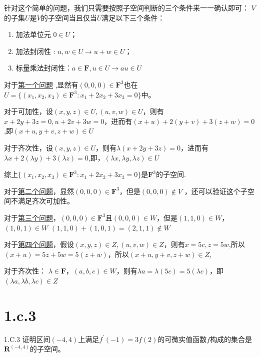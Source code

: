 \documentclass[10pt,a4paper,UTF8]{article}
\begin{document}
\begin{answer}
针对这个简单的问题，我们只需要按照子空间判断的三个条件来一一确认即可：
\(V\)的子集\(U\)是\(V\)的子空间当且仅当\(U\)满足以下三个条件：

\begin{enumerate}
\item 加法单位元 \(0\in U\)；
\item 加法封闭性 : \(u,w\in U \rightarrow u+w\in U\)；
\item 标量乘法封闭性：\(a\in \mathbf{F}, u\in U \rightarrow au\in U\)
\end{enumerate}

对于\hyperref[orgcfdd0be]{第一个问题} ,显然有\((0,0,0)\in \mathbf{F}^{3}\)也在\(U=\{(x_{1},x_{2},x_{3})\in \mathbf{F}^{3}: x_{1} + 2x_{2} + 3x_{3} = 0\}\)中。

对于可加性，设\((x,y,z)\in U,(u,v,w)\in U\)，则有\(x+2y +3z = 0, u+2v+3w =0\)，进而有\((x+u) + 2(y+v) + 3(z+w) = 0\),即\((x+u,y+v,z+w)\in U\)

对于齐次性，设\((x,y,z)\in U\)，则有\(\lambda(x+2y+3z) = 0\)，进而有\(\lambda x + 2(\lambda y) + 3(\lambda z) = 0\),即，\((\lambda x,\lambda y,\lambda z)\in U\)

综上\(\{(x_{1},x_{2},x_{3})\in \mathbf{F}^{3}: x_{1} + 2x_{2} + 3x_{3} = 0\}\)是\(\mathbf{F}^{3}\)的子空间.

对于\hyperref[orga1a8fae]{第二个问题}，显然\((0,0,0)\in \mathbf{F}^{3}\)，但是\((0,0,0)\notin V\) ，还可以验证这个子空间不满足齐次可加性。

对于\hyperref[orgb355b8a]{第三个问题}，\((0,0,0)\in \mathbf{F}^{3}\)且\((0,0,0)\in W\)，但是\((1,1,0)\in W\)，\((1,0,1)\in W\) \((1,1,0) + (1,0,1) = (2,1,1)\notin W\)

对于\hyperref[org8d51ca5]{第四个问题}，假设\((x,y,z)\in Z, (u,v,w)\in Z\)，则有\(x=5c,z=5w\),所以\((x+u)=5z + 5w=5(z+w)\)，所以\((x+u,y+v,z+w)\in Z\), 

对于齐次性： \(\lambda \in \mathbf{F}\)，\((a,b,c)\in W\)，则有\(\lambda a = \lambda (5c) = 5(\lambda c)\)，即\((\lambda a,\lambda b,\lambda c)\in Z\)
\end{answer}
\section*{1.c.3}
\label{sec:org56ebf14}


\begin{problem}
1.C.3 证明区间\((-4,4)\)上满足\(f^{'}(-1) = 3f(2)\)的可微实值函数\(f\)构成的集合是\(\mathbf{R}^{(-4,4)}\)的子空间。
\end{problem}
\end{document}
